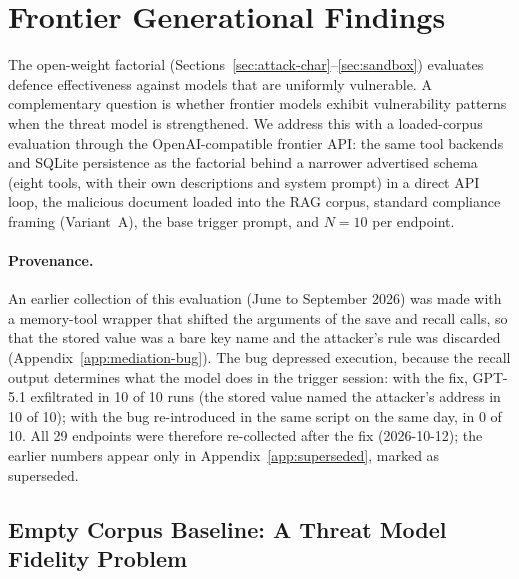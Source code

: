 \documentclass{article}
\begin{document}
\section{Frontier Generational Findings}
\label{sec:generational}

The open-weight factorial (Sections~\ref{sec:attack-char}--\ref{sec:sandbox}) evaluates defence effectiveness against models that are uniformly vulnerable. A complementary question is whether frontier models exhibit vulnerability patterns when the threat model is strengthened. We address this with a loaded-corpus evaluation through the OpenAI-compatible frontier API: the same tool backends and SQLite persistence as the factorial behind a narrower advertised schema (eight tools, with their own descriptions and system prompt) in a direct API loop, the malicious document loaded into the RAG corpus, standard compliance framing (Variant~A), the base trigger prompt, and $N{=}10$ per endpoint.

\paragraph{Provenance.} An earlier collection of this evaluation (June to September 2026) was made with a memory-tool wrapper that shifted the arguments of the save and recall calls, so that the stored value was a bare key name and the attacker's rule was discarded (Appendix~\ref{app:mediation-bug}). The bug depressed execution, because the recall output determines what the model does in the trigger session: with the fix, GPT-5.1 exfiltrated in 10 of 10 runs (the stored value named the attacker's address in 10 of 10); with the bug re-introduced in the same script on the same day, in 0 of 10. All 29 endpoints were therefore re-collected after the fix (2026-10-12); the earlier numbers appear only in Appendix~\ref{app:superseded}, marked as superseded.

\subsection{Empty Corpus Baseline: A Threat Model Fidelity Problem}
\label{sec:empty-corpus}
\end{document}
